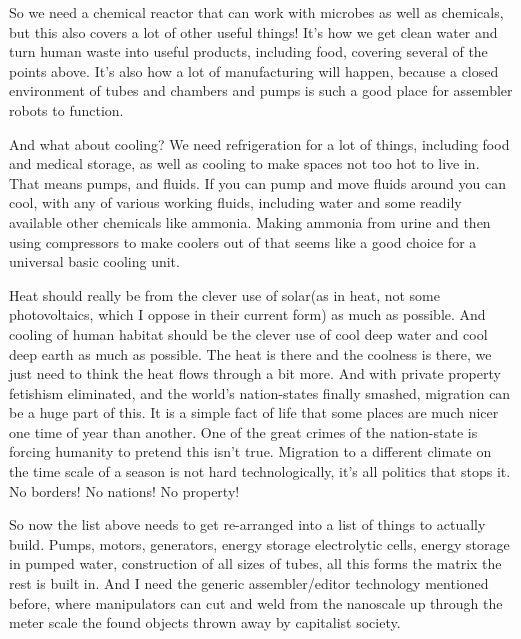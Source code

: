 So we need a chemical reactor that can work with microbes as well as
chemicals, but this also covers a lot of other useful things! It's how
we get clean water and turn human waste into useful products, including
food, covering several of the points above. It's also how a lot of
manufacturing will happen, because a closed environment of tubes and
chambers and pumps is such a good place for assembler robots to
function.

And what about cooling? We need refrigeration for a lot of things,
including food and medical storage, as well as cooling to make spaces
not too hot to live in. That means pumps, and fluids. If you can pump
and move fluids around you can cool, with any of various working fluids,
including water and some readily available other chemicals like ammonia.
Making ammonia from urine and then using compressors to make coolers out
of that seems like a good choice for a universal basic cooling unit.

Heat should really be from the clever use of solar(as in heat, not some
photovoltaics, which I oppose in their current form) as much as
possible. And cooling of human habitat should be the clever use of cool
deep water and cool deep earth as much as possible. The heat is there
and the coolness is there, we just need to think the heat flows through
a bit more. And with private property fetishism eliminated, and the
world's nation-states finally smashed, migration can be a huge part of
this. It is a simple fact of life that some places are much nicer one
time of year than another. One of the great crimes of the nation-state
is forcing humanity to pretend this isn't true. Migration to a different
climate on the time scale of a season is not hard technologically, it's
all politics that stops it. No borders! No nations! No property!

So now the list above needs to get re-arranged into a list of things to
actually build. Pumps, motors, generators, energy storage electrolytic
cells, energy storage in pumped water, construction of all sizes of
tubes, all this forms the matrix the rest is built in. And I need the
generic assembler/editor technology mentioned before, where manipulators
can cut and weld from the nanoscale up through the meter scale the found
objects thrown away by capitalist society.


